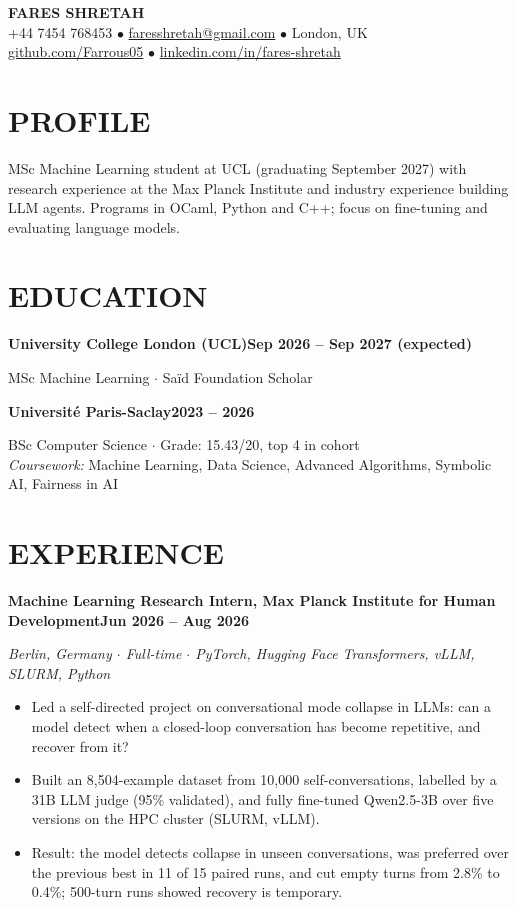 \documentclass[10pt, a4paper]{article}
\newcommand{\entry}[2]{\vspace{5pt}\textbf{#1}\hfill\textbf{#2}\par}
\newcommand{\sub}[1]{\textit{#1}\par}
\begin{document}
\begin{center}
    {\huge \textbf{FARES SHRETAH}} \\[3pt]
    \small +44 7454 768453 $\bullet$ \href{mailto:faresshretah@gmail.com}{faresshretah@gmail.com} $\bullet$ London, UK \\
    \small \href{https://github.com/Farrous05}{github.com/Farrous05} $\bullet$ \href{https://www.linkedin.com/in/fares-shretah/}{linkedin.com/in/fares-shretah}
\end{center}

\section*{PROFILE}
MSc Machine Learning student at UCL (graduating September 2027) with research experience at the Max Planck Institute and industry experience building LLM agents. Programs in OCaml, Python and C++; focus on fine-tuning and evaluating language models.

\section*{EDUCATION}
\entry{University College London (UCL)}{Sep 2026 -- Sep 2027 (expected)}
MSc Machine Learning $\cdot$ Sa\"id Foundation Scholar

\entry{Universit\'e Paris-Saclay}{2023 -- 2026}
BSc Computer Science $\cdot$ Grade: 15.43/20, top 4 in cohort \\
\textit{Coursework:} Machine Learning, Data Science, Advanced Algorithms, Symbolic AI, Fairness in AI

\section*{EXPERIENCE}
\entry{Machine Learning Research Intern, Max Planck Institute for Human Development}{Jun 2026 -- Aug 2026}
\sub{Berlin, Germany $\cdot$ Full-time $\cdot$ PyTorch, Hugging Face Transformers, vLLM, SLURM, Python}
\begin{itemize}
    \item Led a self-directed project on conversational mode collapse in LLMs: can a model detect when a closed-loop conversation has become repetitive, and recover from it?
    \item Built an 8,504-example dataset from 10,000 self-conversations, labelled by a 31B LLM judge (95\% validated), and fully fine-tuned Qwen2.5-3B over five versions on the HPC cluster (SLURM, vLLM).
    \item Result: the model detects collapse in unseen conversations, was preferred over the previous best in 11 of 15 paired runs, and cut empty turns from 2.8\% to 0.4\%; 500-turn runs showed recovery is temporary.
\end{itemize}
\end{document}
